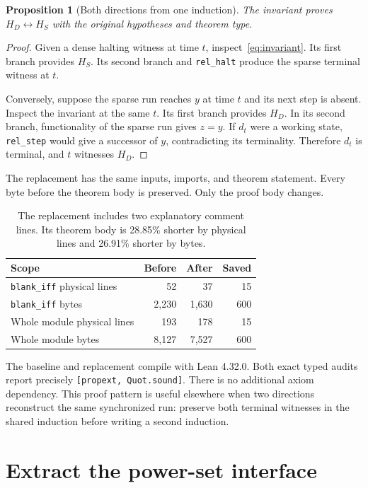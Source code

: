 \documentclass[11pt]{article}
\newtheorem{proposition}[theorem]{Proposition}
\begin{document}
\begin{proposition}[Both directions from one induction]
The invariant proves $H_D\leftrightarrow H_S$ with the original hypotheses and theorem type.
\end{proposition}

\begin{proof}
Given a dense halting witness at time $t$, inspect~\eqref{eq:invariant}. Its first branch provides $H_S$. Its second branch and \texttt{rel\_halt} produce the sparse terminal witness at $t$.

Conversely, suppose the sparse run reaches $y$ at time $t$ and its next step is absent. Inspect the invariant at the same $t$. Its first branch provides $H_D$. In its second branch, functionality of the sparse run gives $z=y$. If $d_t$ were a working state, \texttt{rel\_step} would give a successor of $y$, contradicting its terminality. Therefore $d_t$ is terminal, and $t$ witnesses $H_D$.
\end{proof}

The replacement has the same inputs, imports, and theorem statement. Every byte before the theorem body is preserved. Only the proof body changes.

\begin{table}[ht]
\centering
\begin{tabular}{lrrr}
\toprule
Scope & Before & After & Saved\\
\midrule
\texttt{blank\_iff} physical lines & 52 & 37 & 15\\
\texttt{blank\_iff} bytes & 2,230 & 1,630 & 600\\
Whole module physical lines & 193 & 178 & 15\\
Whole module bytes & 8,127 & 7,527 & 600\\
\bottomrule
\end{tabular}
\caption{The replacement includes two explanatory comment lines. Its theorem body is 28.85\% shorter by physical lines and 26.91\% shorter by bytes.}
\end{table}

The baseline and replacement compile with Lean 4.32.0. Both exact typed audits report precisely \texttt{[propext, Quot.sound]}. There is no additional axiom dependency. This proof pattern is useful elsewhere when two directions reconstruct the same synchronized run: preserve both terminal witnesses in the shared induction before writing a second induction.

\section{Extract the power-set interface}
\end{document}
